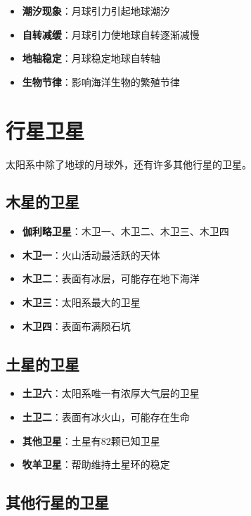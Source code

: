 \documentclass[12pt,UTF8]{ctexbook}
\begin{document}
\begin{itemize}
  \item \textbf{潮汐现象}：月球引力引起地球潮汐
  \item \textbf{自转减缓}：月球引力使地球自转逐渐减慢
  \item \textbf{地轴稳定}：月球稳定地球自转轴
  \item \textbf{生物节律}：影响海洋生物的繁殖节律
\end{itemize}

\section{行星卫星}

太阳系中除了地球的月球外，还有许多其他行星的卫星。

\subsection{木星的卫星}

\begin{itemize}
  \item \textbf{伽利略卫星}：木卫一、木卫二、木卫三、木卫四
  \item \textbf{木卫一}：火山活动最活跃的天体
  \item \textbf{木卫二}：表面有冰层，可能存在地下海洋
  \item \textbf{木卫三}：太阳系最大的卫星
  \item \textbf{木卫四}：表面布满陨石坑
\end{itemize}

\subsection{土星的卫星}

\begin{itemize}
  \item \textbf{土卫六}：太阳系唯一有浓厚大气层的卫星
  \item \textbf{土卫二}：表面有冰火山，可能存在生命
  \item \textbf{其他卫星}：土星有82颗已知卫星
  \item \textbf{牧羊卫星}：帮助维持土星环的稳定
\end{itemize}

\subsection{其他行星的卫星}
\end{document}

